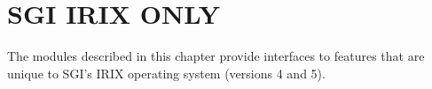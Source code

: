 \chapter{SGI IRIX ONLY}

The modules described in this chapter provide interfaces to features
that are unique to SGI's IRIX operating system (versions 4 and 5).
